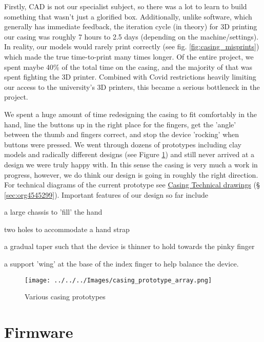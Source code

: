 \documentclass[logo,bsc,singlespacing,parskip]{infthesis}
\begin{document}
Firstly, CAD is not our specialist subject, so there was a lot to learn to build something that wasn't just a glorified box.
Additionally, unlike software, which generally has immediate feedback, the iteration cycle (in theory) for 3D printing our casing was roughly 7 hours to 2.5 days (depending on the machine/settings).
In reality, our models would rarely print correctly (see fig. \ref{fig:casing_misprints}) which made the true time-to-print many times longer.
Of the entire project, we spent maybe 40\% of the total time on the casing, and the majority of that was spent fighting the 3D printer.
Combined with Covid restrictions heavily limiting our access to the university's 3D printers, this became a serious bottleneck in the project.

We spent a huge amount of time redesigning the casing to fit comfortably in the hand, line the buttons up in the right place for the fingers, get the 'angle' between the thumb and fingers correct, and stop the device 'rocking' when buttons were pressed.
We went through dozens of prototypes including clay models and radically different designs (see Figure \ref{fig:casing_prototypes}) and still never arrived at a design we were truly happy with.
In this sense the casing is very much a work in progress, however, we do think our design is going in roughly the right direction.
For technical diagrams of the current prototype see
\hyperref[sec:org4545299]{Casing Technical drawings} (§ \ref{sec:org4545299}).
Important features of our design so far include
\begin{enumerate*}[label={\arabic*)}, itemjoin={, \,}, itemjoin*={, and \,}]
\item a large chassis to 'fill' the hand
\item two holes to accommodate a hand strap
\item a gradual taper such that the device is thinner to hold towards the pinky finger
\item a support 'wing' at the base of the index finger to help balance the device.
\end{enumerate*}

\begin{figure}[h]
\centering
\texttt{[image: ../../../Images/casing\_prototype\_array.png]}
\caption{\label{fig:casing_prototypes}Various casing prototypes}
\end{figure}
\section{Firmware}
\label{sec:orgb89fed5}
\end{document}
